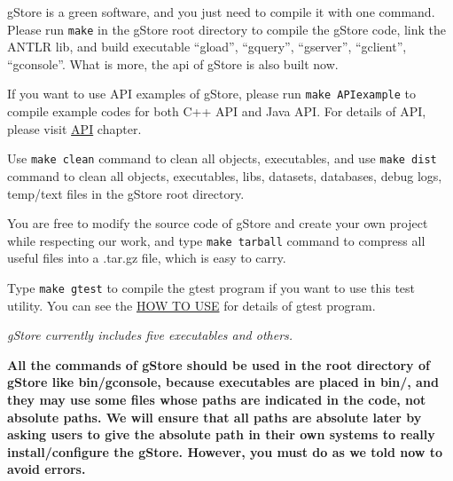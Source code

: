 \documentclass[titlepage, a4paper, 12pt]{article}
\begin{document}
\clearpage


gStore is a green software, and you just need to compile it with one command. Please run \texttt{make} in the gStore root directory to compile the gStore code, link the ANTLR lib, and build executable ``gload'', ``gquery'', ``gserver'', ``gclient'', ``gconsole''. What is more, the api of gStore is also built now.

If you want to use API examples of gStore, please run \texttt{make\ APIexample} to compile example codes for both C++ API and Java API. For details of API, please visit \hyperref[chapter05]{API} chapter.

Use \texttt{make\ clean} command to clean all objects, executables, and use \texttt{make\ dist} command to clean all objects, executables, libs, datasets, databases, debug logs, temp/text files in the gStore root directory.

You are free to modify the source code of gStore and create your own project while respecting our work, and type \texttt{make\ tarball} command to compress all useful files into a .tar.gz file, which is easy to carry.

Type \texttt{make\ gtest} to compile the gtest program if you want to use this test utility. You can see the \hyperref[chapter04]{HOW TO USE} for details of gtest program.

\clearpage


\textit{gStore currently includes five executables and others.}

\textbf{All the commands of gStore should be used in the root directory of gStore like bin/gconsole, because executables are placed in bin/, and they may use some files whose paths are indicated in the code, not absolute paths. We will ensure that all paths are absolute later by asking users to give the absolute path in their own systems to really install/configure the gStore. However, you must do as we told now to avoid errors.}

\end{document}
